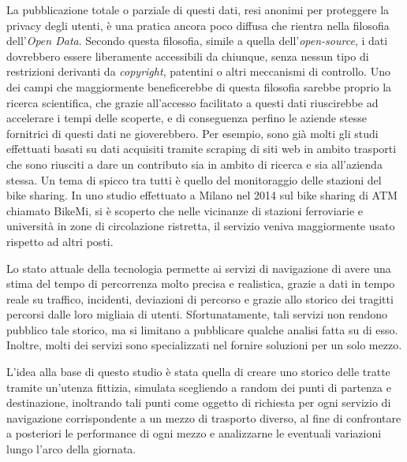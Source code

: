 La pubblicazione totale o parziale di questi dati, resi anonimi per proteggere la privacy degli utenti, è una pratica ancora poco diffusa che rientra nella filosofia dell'\emph{Open Data}. Secondo questa filosofia, simile a quella dell'\emph{open-source}, i dati dovrebbero essere liberamente accessibili da chiunque, senza nessun tipo di restrizioni derivanti da \emph{copyright}, patentini o altri meccanismi di controllo. Uno dei campi che maggiormente beneficerebbe di questa filosofia sarebbe proprio la ricerca scientifica, che grazie all'accesso facilitato a questi dati riuscirebbe ad accelerare i tempi delle scoperte, e di conseguenza perfino le aziende stesse fornitrici di questi dati ne gioverebbero. Per esempio, sono già molti gli studi effettuati basati su dati acquisiti tramite scraping di siti web in ambito trasporti che sono riusciti a dare un contributo sia in ambito di ricerca e sia all'azienda stessa. Un tema di spicco tra tutti è quello del monitoraggio delle stazioni del bike sharing. In uno studio effettuato a Milano nel 2014\cite{croci2014} sul bike sharing di ATM chiamato BikeMi, si è scoperto che nelle vicinanze di stazioni ferroviarie e università in zone di circolazione ristretta, il servizio veniva maggiormente usato rispetto ad altri posti.

















Lo stato attuale della tecnologia permette ai servizi di navigazione di avere una stima del tempo di percorrenza molto precisa e realistica, grazie a dati in tempo reale su traffico, incidenti, deviazioni di percorso e grazie allo storico dei tragitti percorsi dalle loro migliaia di utenti. Sfortunatamente, tali servizi non rendono pubblico tale storico, ma si limitano a pubblicare qualche analisi fatta su di esso. Inoltre, molti dei servizi sono specializzati nel fornire soluzioni per un solo mezzo.

\cite{croci2014}

\cite{rotaris2010}

\cite{rotaris2019}

\cite{meinardi2008}


L'idea alla base di questo studio è stata quella di creare uno storico delle tratte tramite un'utenza fittizia, simulata scegliendo a random dei punti di partenza e destinazione, inoltrando tali punti come oggetto di richiesta per ogni servizio di navigazione corrispondente a un mezzo di trasporto diverso, al fine di confrontare a posteriori le performance di ogni mezzo e analizzarne le eventuali variazioni lungo l'arco della giornata.
